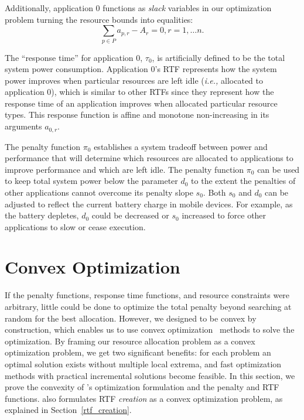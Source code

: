 Additionally, application 0 functions as \emph{slack} variables in our optimization problem turning the resource bounds into equalities:
\begin{equation}
\sum_{p\in P} a_{p,r} - A_r = 0, r = 1,\dots n.
\end{equation}

The ``response time'' for application 0, $\tau_0$, is artificially
defined to be the total system power consumption.  Application 0's RTF represents how the system power improves when particular resources are left idle (\emph{i.e.,} allocated to application 0), which is similar to other RTFs since they represent how the response time of an application improves when allocated particular resource types. This response function is affine and monotone non-increasing in its arguments $a_{0,r}$.

The penalty function $\pi_0$ establishes a system tradeoff between
power and performance that will determine which resources are
allocated to applications to improve performance and which are left
idle.  The penalty function $\pi_0$ can be used to keep total system
power below the parameter $d_0$ to the extent the penalties of other
applications cannot overcome its penalty slope $s_0$. Both $s_0$ and
$d_0$ can be adjusted to reflect the current battery charge in mobile
devices. For example, as the battery depletes, $d_0$ could be decreased or $s_0$ increased
to force other applications to slow or cease execution.


\section{Convex Optimization}\label{convex_sec}
If the penalty functions, response time functions, and resource
constraints were arbitrary, little could be done to optimize the total
penalty beyond searching at random for the best allocation.  However, we designed \pacora to be convex by construction, which enables us to use convex optimization~\cite{BoVa} methods to solve the optimization. 
By framing our resource allocation problem as a convex optimization problem, we get two significant benefits: for each problem an optimal
solution exists without multiple local extrema, and fast optimization methods with practical incremental solutions become feasible.  In this section, we prove the convexity of \pacora's optimization formulation and the penalty and RTF functions. \pacora also formulates RTF \emph{creation} as a convex optimization
problem, as explained in Section~\ref{rtf_creation}.

